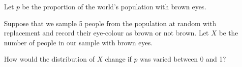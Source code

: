 \begin{frame}
  \begin{block}{\example}
    Let $p$ be the proportion of the world's population with brown eyes. 
    
    \bigskip

    Suppose that we sample 5 people from the population at random with replacement and record their eye-colour as brown or not brown. Let $X$ be the number of people in our sample with brown eyes.
    
    \bigskip

    How would the distribution of $X$ change if $p$ was varied between 0 and 1?
  \end{block}
\end{frame}

\begin{frame}


\end{frame}
